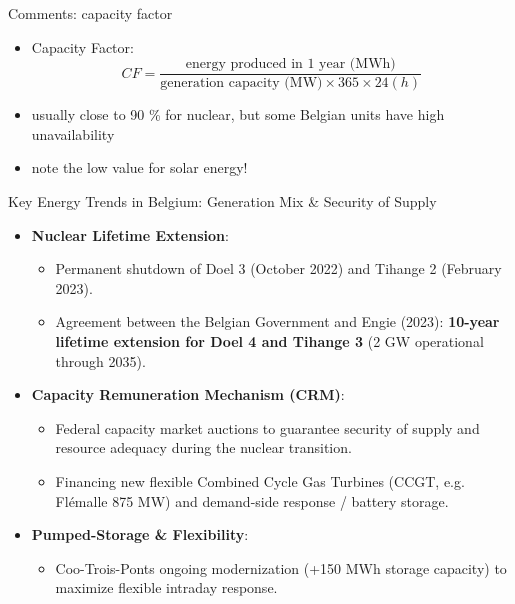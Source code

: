 \begin{frame}{Comments: capacity factor}
\begin{itemize}
\item Capacity Factor: 
$$CF = \frac{\text{energy produced in 1 year (MWh)}}{\text{generation capacity (MW)} \times 365 \times 24(h)}$$

\item usually close to 90 \% for nuclear, but some Belgian units have high unavailability
\item note the low value for solar energy!
\end{itemize}
\end{frame}

\begin{frame}{\Large Key Energy Trends in Belgium: Generation Mix \& Security of Supply}
\begin{itemize}
\item \textbf{Nuclear Lifetime Extension}:
\begin{itemize}
  \item Permanent shutdown of Doel 3 (October 2022) and Tihange 2 (February 2023).
  \item Agreement between the Belgian Government and Engie (2023): \textbf{10-year lifetime extension for Doel 4 and Tihange 3} (2 GW operational through 2035).
\end{itemize}
\item \textbf{Capacity Remuneration Mechanism (CRM)}:
\begin{itemize}
  \item Federal capacity market auctions to guarantee security of supply and resource adequacy during the nuclear transition.
  \item Financing new flexible Combined Cycle Gas Turbines (CCGT, e.g. Flémalle 875 MW) and demand-side response / battery storage.
\end{itemize}
\item \textbf{Pumped-Storage \& Flexibility}:
\begin{itemize}
  \item Coo-Trois-Ponts ongoing modernization (+150 MWh storage capacity) to maximize flexible intraday response.
\end{itemize}
\end{itemize}
\end{frame}

